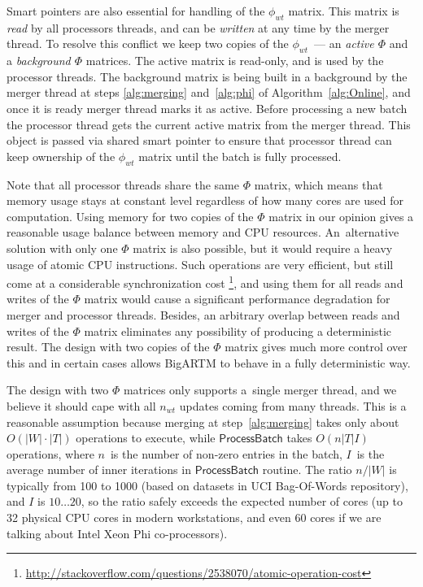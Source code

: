 \documentclass[russian]{llncs}
\newcommand{\kw}[1]{\textsf{#1}}
\begin{document}
Smart pointers are also essential for handling of the $\phi_{wt}$ matrix.
This matrix is \emph{read} by all processors threads, and can be \emph{written} at any time by the merger thread.
To resolve this conflict we keep two copies of the $\phi_{wt}$~--- an \emph{active $\Phi$} and a \emph{background $\Phi$} matrices.
The active matrix is read-only, and is used by the processor threads.
The background matrix is being built in a background by the merger thread
at steps \ref{alg:merging} and~\ref{alg:phi} of Algorithm~\ref{alg:Online},
and once it is ready merger thread marks it as active.
Before processing a new batch the processor thread gets the current active matrix from the merger thread.
This object is passed via shared smart pointer to ensure that processor thread can keep ownership of the $\phi_{wt}$ matrix
until the batch is fully processed.

Note that all processor threads share the same $\Phi$ matrix,
which means that memory usage stays at constant level regardless of how many cores are used for computation.
Using memory for two copies of the $\Phi$ matrix in our opinion gives a reasonable usage balance between memory and CPU resources.
An~alternative solution with only one $\Phi$ matrix is also possible, but it would require a heavy usage of atomic CPU instructions.
Such operations are very efficient, but still come at a considerable synchronization cost%
\footnote{\url{http://stackoverflow.com/questions/2538070/atomic-operation-cost}},
and using them for all reads and writes of the $\Phi$ matrix would cause a significant performance degradation for merger and processor threads.
Besides, an arbitrary overlap between reads and writes of the $\Phi$ matrix eliminates any possibility of producing a deterministic result.
The design with two copies of the $\Phi$ matrix gives much more control over this
and in certain cases allows BigARTM to behave in a fully deterministic way.

The design with two $\Phi$ matrices only supports a~single merger thread,
and we believe it should cape with all $n_{wt}$ updates coming from many threads.
This is a reasonable assumption because
merging at step~\ref{alg:merging} takes only about $O(|W|\cdot|T|)$ operations to execute, while
$\kw{ProcessBatch}$ takes $O(n |T| I)$ operations,
where
$n$~is the number of non-zero entries in the batch,
$I$~is the average number of inner iterations in $\kw{ProcessBatch}$ routine.
The ratio $n / |W|$ is typically from 100 to 1000 (based on datasets in UCI Bag-Of-Words repository),
and $I$ is $10 \dots 20$, so the ratio safely exceeds the expected number of cores
(up to 32 physical CPU cores in modern workstations, and even 60 cores if we are talking about Intel Xeon Phi co-processors).
\end{document}
